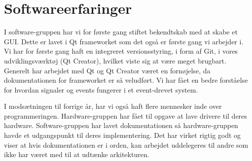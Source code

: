 \section{Softwareerfaringer}

I software-gruppen har vi for første gang stiftet bekendtskab med at skabe et GUI. Dette er lavet i Qt frameworket som det også er første gang vi arbejder i. Vi har for første gang haft en integreret versionsstyring, i form af Git, i vores udviklingsværktøj (Qt Creator), hvilket viste sig at være meget brugbart. Generelt har arbejdet med Qt og Qt Creator været en fornøjelse, da dokumentationen for frameworket er så veludført. Vi har fået en bedre forståelse for hvordan signaler og events fungerer i et event-drevet system.

I modsætningen til forrige år, har vi også haft flere mennesker inde over programmeringen. Hardware-gruppen har fået til opgave at lave drivere til deres hardware. Software-gruppen har lavet dokumentationen så hardware-gruppen havde et udgangspunkt til deres implementering. Det har virket rigtig godt og viser at hvis dokumentationen er i orden, kan arbejdet uddelegeres til andre som ikke har været med til at udtænke arkitekturen.